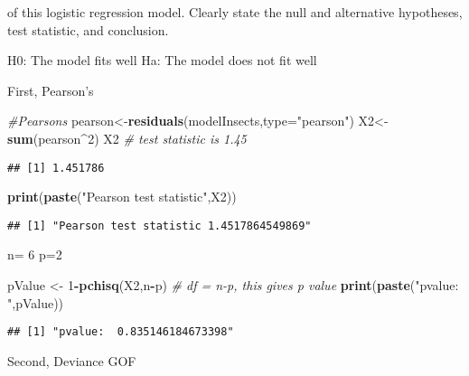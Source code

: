 \documentclass[
]{article}
\newenvironment{Shaded}{\begin{snugshade}}{\end{snugshade}}
\newcommand{\CommentTok}[1]{\textcolor[rgb]{0.56,0.35,0.01}{\textit{#1}}}
\newcommand{\DataTypeTok}[1]{\textcolor[rgb]{0.13,0.29,0.53}{#1}}
\newcommand{\DecValTok}[1]{\textcolor[rgb]{0.00,0.00,0.81}{#1}}
\newcommand{\KeywordTok}[1]{\textcolor[rgb]{0.13,0.29,0.53}{\textbf{#1}}}
\newcommand{\NormalTok}[1]{#1}
\newcommand{\OperatorTok}[1]{\textcolor[rgb]{0.81,0.36,0.00}{\textbf{#1}}}
\newcommand{\StringTok}[1]{\textcolor[rgb]{0.31,0.60,0.02}{#1}}
\begin{document}
of this logistic regression model. Clearly state the null and
alternative hypotheses, test statistic, and conclusion.

H0: The model fits well Ha: The model does not fit well

First, Pearson's

\begin{Shaded}
\begin{Highlighting}[]
\CommentTok{#Pearsons}
\NormalTok{pearson<-}\KeywordTok{residuals}\NormalTok{(modelInsects,}\DataTypeTok{type=}\StringTok{"pearson"}\NormalTok{)}
\NormalTok{X2<-}\KeywordTok{sum}\NormalTok{(pearson}\OperatorTok{^}\DecValTok{2}\NormalTok{)}
\NormalTok{X2 }\CommentTok{# test statistic is 1.45}
\end{Highlighting}
\end{Shaded}

\begin{verbatim}
## [1] 1.451786
\end{verbatim}

\begin{Shaded}
\begin{Highlighting}[]
\KeywordTok{print}\NormalTok{(}\KeywordTok{paste}\NormalTok{(}\StringTok{"Pearson test statistic"}\NormalTok{,X2))}
\end{Highlighting}
\end{Shaded}

\begin{verbatim}
## [1] "Pearson test statistic 1.4517864549869"
\end{verbatim}

\begin{Shaded}
\begin{Highlighting}[]
\NormalTok{n=}\StringTok{ }\DecValTok{6}
\NormalTok{p=}\DecValTok{2}

\NormalTok{pValue <-}\StringTok{ }\DecValTok{1}\OperatorTok{-}\KeywordTok{pchisq}\NormalTok{(X2,n}\OperatorTok{-}\NormalTok{p) }\CommentTok{# df = n-p, this gives p value}
\KeywordTok{print}\NormalTok{(}\KeywordTok{paste}\NormalTok{(}\StringTok{"pvalue: "}\NormalTok{,pValue))}
\end{Highlighting}
\end{Shaded}

\begin{verbatim}
## [1] "pvalue:  0.835146184673398"
\end{verbatim}

Second, Deviance GOF

\begin{Shaded}
\end{Shaded}
\end{document}
